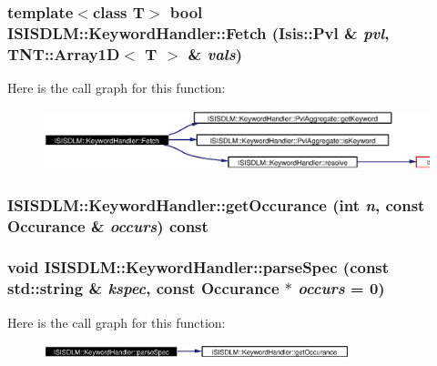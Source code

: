 \subsubsection{\setlength{\rightskip}{0pt plus 5cm}template$<$class T$>$ bool ISISDLM::Keyword\-Handler::Fetch (Isis::Pvl \& {\em pvl}, TNT::Array1D$<$ T $>$ \& {\em vals})}\label{classISISDLM_1_1KeywordHandler_a7}




Here is the call graph for this function:\begin{figure}[H]
\begin{center}
\leavevmode
\includegraphics[width=400pt]{classISISDLM_1_1KeywordHandler_a7_cgraph}
\end{center}
\end{figure}
\subsubsection{ ISISDLM::Keyword\-Handler::get\-Occurance (int {\em n}, const {\bf Occurance} \& {\em occurs}) const\hspace{0.3cm}{\tt  [private]}}\label{classISISDLM_1_1KeywordHandler_d1}


\subsubsection{\setlength{\rightskip}{0pt plus 5cm}void ISISDLM::Keyword\-Handler::parse\-Spec (const std::string \& {\em kspec}, const {\bf Occurance} $\ast$ {\em occurs} = 0)\hspace{0.3cm}{\tt  [private]}}\label{classISISDLM_1_1KeywordHandler_d0}




Here is the call graph for this function:\begin{figure}[H]
\begin{center}
\leavevmode
\includegraphics[width=252pt]{classISISDLM_1_1KeywordHandler_d0_cgraph}
\end{center}
\end{figure}
